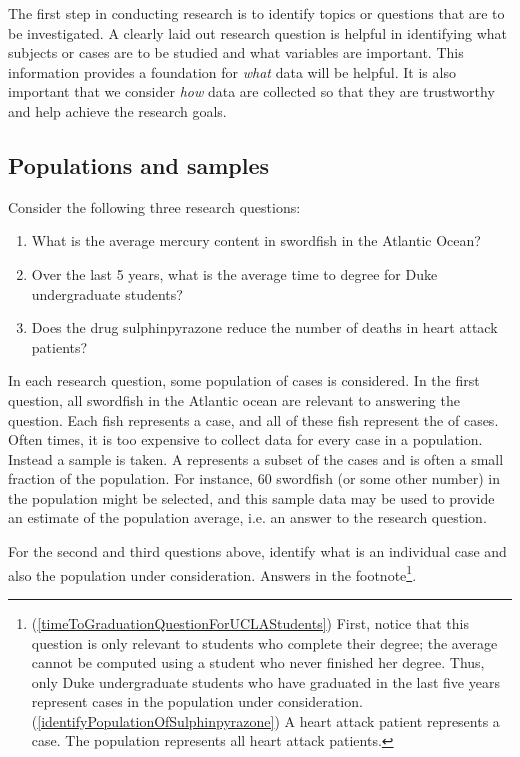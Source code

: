The first step in conducting research is to identify topics or questions that are to be investigated. A clearly laid out research question is helpful in identifying what subjects or cases are to be studied and what variables are important. This information provides a foundation for \emph{what} data will be helpful. It is also important that we consider \emph{how} data are collected so that they are trustworthy and help achieve the research goals. %

\subsection{Populations and samples}
\label{populationsAndSamples}

Consider the following three research questions:
\begin{enumerate}
\setlength{\itemsep}{0mm}
\item What is the average mercury content in swordfish in the Atlantic Ocean?
\item\label{timeToGraduationQuestionForUCLAStudents} Over the last 5 years, what is the average time to degree for Duke undergraduate students?
\item\label{identifyPopulationOfSulphinpyrazone} Does the drug sulphinpyrazone reduce the number of deaths in heart attack patients? 
\end{enumerate}
In each research question, some population of cases is considered. In the first question, all swordfish in the Atlantic ocean are relevant to answering the question. Each fish represents a case, and all of these fish represent the  of cases. Often times, it is too expensive to collect data for every case in a population. Instead a sample is taken. A  represents a subset of the cases and is often a small fraction of the population. For instance, 60 swordfish (or some other number) in the population might be selected, and this sample data may be used to provide an estimate of the population average, i.e. an answer to the research question.

\begin{exercise} \label{identifyingThePopulationForTwoQuestionsInPopAndSampSubsection}
For the second and third questions above, identify what is an individual case and also the population under consideration.  Answers in the footnote\footnote{(\ref{timeToGraduationQuestionForUCLAStudents}) First, notice that this question is only relevant to students who complete their degree; the average cannot be computed using a student who never finished her degree. Thus, only Duke undergraduate students who have graduated in the last five years represent cases in the population under consideration. (\ref{identifyPopulationOfSulphinpyrazone}) A heart attack patient represents a case. The population represents all heart attack patients.}.
\end{exercise}


